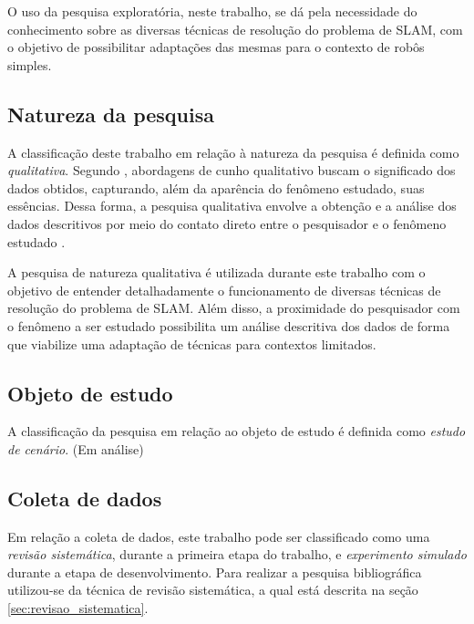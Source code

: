 		O uso da pesquisa exploratória, neste trabalho, se dá pela necessidade do conhecimento sobre as diversas técnicas de resolução do problema de SLAM, com o objetivo de possibilitar adaptações das mesmas para o contexto de robôs simples.

	\subsection{Natureza da pesquisa} %
	\label{sec:classificação_quanto_à_natureza_da_pesquisa}
	
		A classificação deste trabalho em relação à natureza da pesquisa é definida como \textit{qualitativa}. Segundo \cite{metodologiaCientifica}, abordagens de cunho qualitativo buscam o significado dos dados obtidos, capturando, além da aparência do fenômeno estudado, suas essências. Dessa forma, a pesquisa qualitativa envolve a obtenção e a análise dos dados descritivos por meio do contato direto entre o pesquisador e o fenômeno estudado \cite{metodologiaCientifica}. 

		A pesquisa de natureza qualitativa é utilizada durante este trabalho com o objetivo de entender detalhadamente o funcionamento de diversas técnicas de resolução do problema de SLAM. Além disso, a proximidade do pesquisador com o fenômeno a ser estudado possibilita um análise descritiva dos dados de forma que viabilize uma adaptação de técnicas para contextos limitados. 

	\subsection{Objeto de estudo} %
	\label{sec:classificação_quanto_à_escolha_do_objeto_de_estudo}
	
		A classificação da pesquisa em relação ao objeto de estudo é definida como \textit{estudo de cenário}. (Em análise)

	\subsection{Coleta de dados} %
	\label{sec:classificação_quanto_à_técnica_de_coleta_de_dados}

		Em relação a coleta de dados, este trabalho pode ser classificado como uma \textit{revisão sistemática}, durante a primeira etapa do trabalho, e \textit{experimento simulado} durante a etapa de desenvolvimento. Para realizar a pesquisa bibliográfica utilizou-se da técnica de revisão sistemática, a qual está descrita na seção \ref{sec:revisao_sistematica}.

